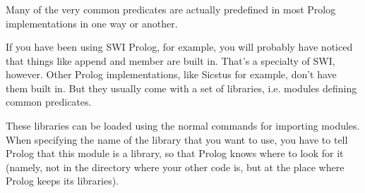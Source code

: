 

\begin{frame}
	\frametitle{\insertsection}
	
	Many of the very common predicates are actually predefined in most Prolog implementations in one way or another. 
	
	If you have been using SWI Prolog, for example, you will probably have noticed that things like append and member are built in. That’s a specialty of SWI, however. Other Prolog implementations, like Sicstus for example, don’t have them built in. But they usually come with a set of libraries, i.e. modules defining common predicates. 
	
	These libraries can be loaded using the normal commands for importing modules. When specifying the name of the library that you want to use, you have to tell Prolog that this module is a library, so that Prolog knows where to look for it (namely, not in the directory where your other code is, but at the place where Prolog keeps its libraries).
	
\end{frame}


